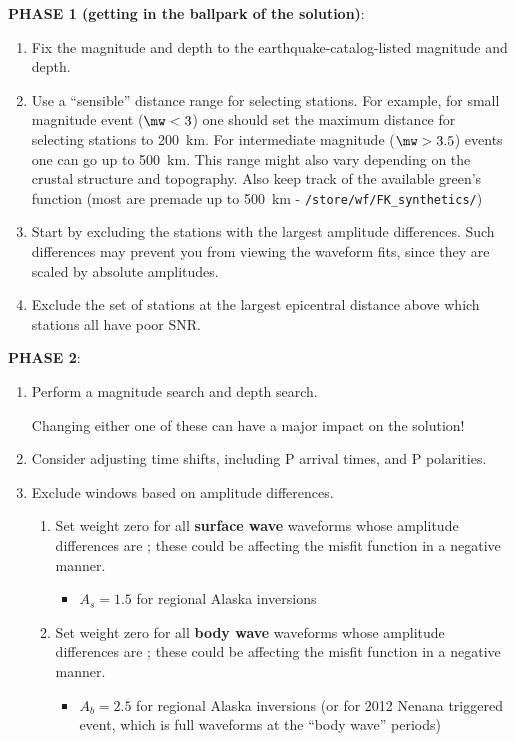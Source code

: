 \begin{enumerate}
\medskip\noindent
{\bf PHASE 1 (getting in the ballpark of the solution)}:
%
\begin{enumerate}
\item Fix the magnitude and depth to the earthquake-catalog-listed magnitude and depth.

\item Use a ``sensible'' distance range for selecting stations. For example, for small magnitude event ($\mw < 3$) one should set the maximum distance for selecting stations to 200~km. For intermediate magnitude ($\mw > 3.5$) events one can go up to 500~km. This range might also vary depending on the crustal structure and topography. Also keep track of the available green's function (most are premade up to 500~km - \verb+/store/wf/FK_synthetics/+)

\item Start by excluding the stations with the largest amplitude differences. Such differences may prevent you from viewing the waveform fits, since they are scaled by absolute amplitudes.

\item Exclude the set of stations at the largest epicentral distance above which stations all have poor SNR.
\end{enumerate}

\medskip\noindent
{\bf PHASE 2}:
\begin{enumerate}
\item Perform a magnitude search and depth search.

Changing either one of these can have a major impact on the solution!

\item Consider adjusting time shifts, including P arrival times, and P polarities.

\item Exclude windows based on amplitude differences.
%
\begin{enumerate}
\item Set weight zero for all {\bf surface wave} waveforms whose amplitude differences are ; these could be affecting the misfit function in a negative manner.
\begin{itemize}
\item $A_s = 1.5$ for regional Alaska inversions
\end{itemize}

\item Set weight zero for all {\bf body wave} waveforms whose amplitude differences are ; these could be affecting the misfit function in a negative manner.
\begin{itemize}
\item $A_b = 2.5$ for regional Alaska inversions (or for 2012 Nenana triggered event, which is full waveforms at the ``body wave'' periods)


\end{itemize}
\end{enumerate}
\end{enumerate}
\end{enumerate}

